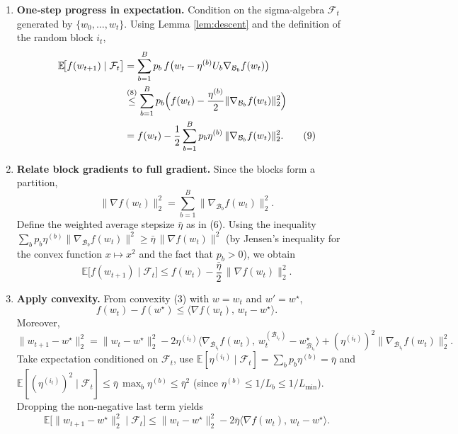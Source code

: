 \documentclass{article}
\newcommand{\E}{\mathbb{E}}
\begin{document}
\begin{enumerate}
\item[Step 1.] \textbf{One‑step progress in expectation.}  
Condition on the sigma‑algebra $\mathcal{F}_{t}$ generated by $\{w_{0},\dots ,w_{t}\}$.  
Using Lemma \ref{lem:descent} and the definition of the random block $i_{t}$,
\begin{align}
\E\!\bigl[f(w_{t+1})\mid\mathcal{F}_{t}\bigr]
&= \sum_{b=1}^{B}p_{b}\,
f\bigl(w_{t}-\eta^{(b)}U_{b}\nabla_{\mathcal{B}_{b}}f(w_{t})\bigr) \nonumber\\
&\overset{(8)}{\le}
\sum_{b=1}^{B}p_{b}\Bigl(
f(w_{t})-\frac{\eta^{(b)}}{2}\|\nabla_{\mathcal{B}_{b}}f(w_{t})\|_{2}^{2}
\Bigr) \nonumber\\
&= f(w_{t})-\frac12\sum_{b=1}^{B}p_{b}\eta^{(b)}\,
\|\nabla_{\mathcal{B}_{b}}f(w_{t})\|_{2}^{2}.
\tag{9}
\end{align}

\item[Step 2.] \textbf{Relate block gradients to full gradient.}  
Since the blocks form a partition,
\[
\|\nabla f(w_{t})\|_{2}^{2}
=\sum_{b=1}^{B}\|\nabla_{\mathcal{B}_{b}}f(w_{t})\|_{2}^{2}.
\]
Define the weighted average stepsize $\bar\eta$ as in (6).  Using the inequality
$\sum_{b}p_{b}\eta^{(b)}\|\nabla_{\mathcal{B}_{b}}f(w_{t})\|^{2}
\ge \bar\eta\,\|\nabla f(w_{t})\|^{2}$ (by Jensen’s inequality for the convex function $x\mapsto x^{2}$ and the fact that $p_{b}>0$), we obtain
\[
\E\!\bigl[f(w_{t+1})\mid\mathcal{F}_{t}\bigr]
\le f(w_{t})-\frac{\bar\eta}{2}\,\|\nabla f(w_{t})\|_{2}^{2}.
\tag{10}
\]

\item[Step 3.] \textbf{Apply convexity.}  
From convexity (3) with $w=w_{t}$ and $w'=w^{\star}$,
\[
f(w_{t})-f(w^{\star})\le\langle\nabla f(w_{t}),\,w_{t}-w^{\star}\rangle .
\tag{11}
\]
Moreover,
\[
\|w_{t+1}-w^{\star}\|_{2}^{2}
= \|w_{t}-w^{\star}\|_{2}^{2}
-2\eta^{(i_{t})}\langle\nabla_{\mathcal{B}_{i_{t}}}f(w_{t}),\,w_{t}^{(\mathcal{B}_{i_{t}})}-w^{\star}_{\mathcal{B}_{i_{t}}}\rangle
+(\eta^{(i_{t})})^{2}\|\nabla_{\mathcal{B}_{i_{t}}}f(w_{t})\|_{2}^{2}.
\tag{12}
\]
Take expectation conditioned on $\mathcal{F}_{t}$, use $\E[\eta^{(i_{t})}\mid\mathcal{F}_{t}]=\sum_{b}p_{b}\eta^{(b)}=\bar\eta$ and $\E[(\eta^{(i_{t})})^{2}\mid\mathcal{F}_{t}]\le\bar\eta\,\max_{b}\eta^{(b)}\le\bar\eta^{2}$ (since $\eta^{(b)}\le 1/L_{b}\le 1/L_{\min}$).  Dropping the non‑negative last term yields
\[
\E\!\bigl[\|w_{t+1}-w^{\star}\|_{2}^{2}\mid\mathcal{F}_{t}\bigr]
\le \|w_{t}-w^{\star}\|_{2}^{2}
-2\bar\eta\bigl\langle\nabla f(w_{t}),\,w_{t}-w^{\star}\bigr\rangle .
\tag{13}
\]


\end{enumerate}
\end{document}
